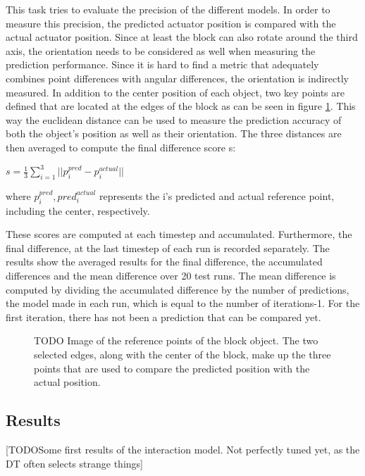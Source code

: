 This task tries to evaluate the precision of the different models. In order to measure this precision, the predicted actuator position
is compared with the actual actuator position. Since at least the block can also rotate around the third axis, the orientation needs to be
considered as well when measuring the prediction performance. Since it is hard to find a metric that adequately combines point differences with
angular differences, the orientation is indirectly measured. In addition to the center position of each object, two key points are defined that
are located at the edges of the block as can be seen in figure \ref{fig:refPoints}. This way the euclidean distance can be used to measure the
prediction accuracy of both the object's position as well as their orientation. The three distances are then averaged to compute the final difference
score s:

\begin{math}
	s = \frac{1}{3} \sum\limits_{i=1}^{3}||p^{pred}_i-p^{actual}_i||
\end{math}

where $p^{pred}_i, pred^{actual}_i$ represents the i's predicted and actual reference point, including the center, respectively.

These scores are computed at each timestep and accumulated. Furthermore, the final difference, at the last timestep of each run is recorded separately.
The results show the averaged results for the final difference, the accumulated differences and the mean difference over 20 test runs. The mean difference
is computed by dividing the accumulated difference by the number of predictions, the model made in each run, which is equal to the number of iterations-1. For the
first iteration, there has not been a prediction that can be compared yet.

\begin{figure}
	
	\caption{TODO Image of the reference points of the block object. The two selected edges, along with the center of the block, make up the three points that are used
		to compare the predicted position with the actual position.}
	\label{fig:refPoints}
\end{figure}

\subsection{Results}
[TODOSome first results of the interaction model. Not perfectly tuned yet, as the DT often selects strange things]

